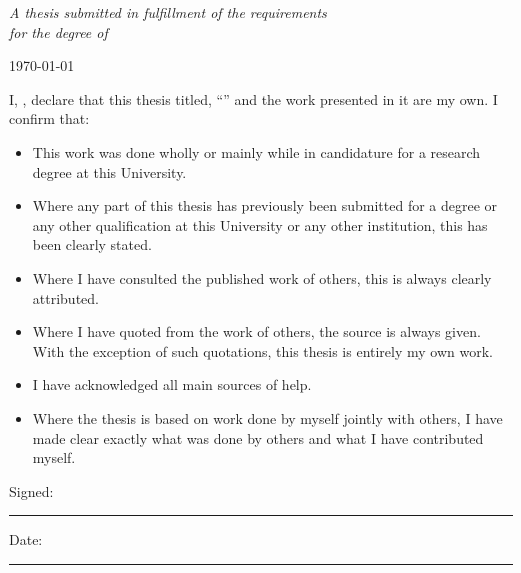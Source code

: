 \documentclass[
12pt, %
oneside, %
english, %
onehalfspacing, %
nolistspacing, %
parskip, %
headsepline, %
]{MastersDoctoralThesis} %
\begin{document}
\begin{titlepage}
\begin{center}
\vfill

\large \textit{A thesis submitted in fulfillment of the requirements\\ for the degree of \degreename}\\[0.2cm] %
 
\vfill

{\large \today}\\[4cm] %
 
\vfill
\end{center}
\end{titlepage}


\begin{declaration}
\addchaptertocentry{\authorshipname} %
\noindent I, \authorname, declare that this thesis titled, \enquote{\ttitle} and the work presented in it are my own. I confirm that:

\begin{itemize} 
\item This work was done wholly or mainly while in candidature for a research degree at this University.
\item Where any part of this thesis has previously been submitted for a degree or any other qualification at this University or any other institution, this has been clearly stated.
\item Where I have consulted the published work of others, this is always clearly attributed.
\item Where I have quoted from the work of others, the source is always given. With the exception of such quotations, this thesis is entirely my own work.
\item I have acknowledged all main sources of help.
\item Where the thesis is based on work done by myself jointly with others, I have made clear exactly what was done by others and what I have contributed myself.\\
\end{itemize}
 
\noindent Signed:\\
\rule[0.5em]{25em}{0.5pt} %
 
\noindent Date:\\
\rule[0.5em]{25em}{0.5pt} %
\end{declaration}
\end{document}
